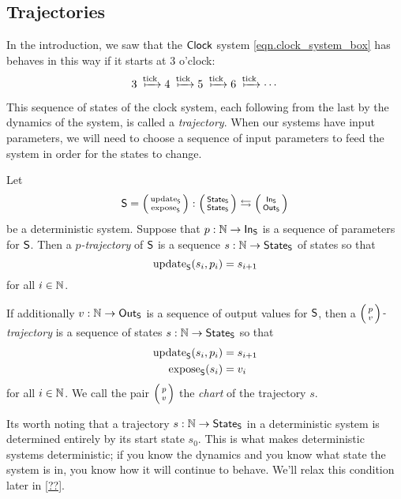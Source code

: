 \documentclass[DynamicalBook]{subfiles}
\begin{document}
\subsection{Trajectories}\label{sec.trajectory_discrete}

In the introduction, we saw that the $\mathsf{Clock}$ system
\cref{eqn.clock_system_box} has behaves in this way if it starts at $3$ o'clock: 
$$3 \xmapsto{\fun{tick}} 4 \xmapsto{\fun{tick}} 5 \xmapsto{\fun{tick}} 6
\xmapsto{\fun{tick}} \cdots$$

This sequence of states of the clock system, each following from the last by the
dynamics of the system, is called a \emph{trajectory}. When our systems have
input parameters, we will need to choose a sequence of input parameters to feed
the system in order for the states to change.

\begin{definition}\label{def.trajectory_discrete}
 Let $$\Sys{S} = \lens{\update{S}}{\expose{S}} : \lens{\State{S}}{\State{S}}
 \leftrightarrows \lens{\In{S}}{\Out{S}}$$
 be a deterministic system. Suppose that $p : \mathbb{N} \to \mathsf{In}_{\mathsf{S}}$ is a sequence of
 parameters for $\mathsf{S}$. Then a \emph{$p$-trajectory} of $\mathsf{S}$ is a sequence $s : \mathbb{N} \to \mathsf{State}_{\mathsf{S}}$ of states so that
 $$\mathrm{update}_{\mathsf{S}}(s_i, p_i) = s_{i + 1}$$
 for all $i \in \mathbb{N}$.

 If additionally $v : \mathbb{N} \to \mathsf{Out}_{\mathsf{S}}$ is a sequence of output values for $\mathsf{S}$, then a
 \emph{$\lens{p}{v}$-trajectory} is a sequence of states $s : \mathbb{N} \to \mathsf{State}_{\mathsf{S}}$ so
 that
 \begin{align*}
   \mathrm{update}_{\mathsf{S}}(s_i, p_i) &= s_{i + 1}\\
   \mathrm{expose}_{\mathsf{S}}(s_i) &= v_i
 \end{align*}
 for all $i \in \mathbb{N}$. We call the pair $\lens{p}{v}$ the \emph{chart} of the trajectory $s$.
\end{definition}

Its worth noting that a trajectory $s : \mathbb{N} \to \mathsf{State}_{\mathsf{S}}$ in a deterministic system is determined
entirely by its start state $s_0$. This is what makes deterministic systems
deterministic; if you know the dynamics and you know what state the system is
in, you know how it will continue to behave. We'll relax this condition later in \cref{??}.
\end{document}
